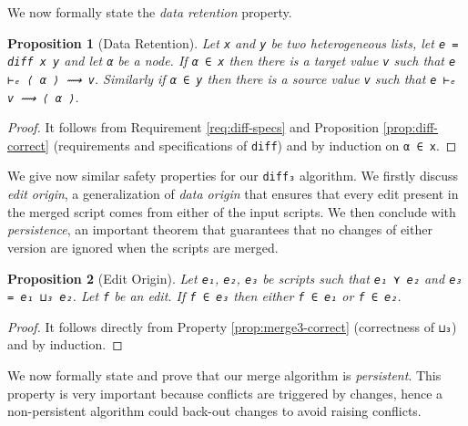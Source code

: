 \documentclass[preprint]{sigplanconf}
\theoremstyle{plain}
\newtheorem{prop}{Proposition}
\begin{document}
We now formally state the \emph{data retention} property.
\begin{prop}[Data Retention]
\label{prop:data-retention}
  Let \texttt{x} and \texttt{y} be two heterogeneous lists, let
  \texttt{e = diff x y} and let \texttt{α} be a node.
%
  If \texttt{α ∈ x} then there is a target value \texttt{v} such that
  \texttt{e ⊢ₑ ⟨ α ⟩ ⟿ v}.
%
  Similarly if \texttt{α ∈ y} then there is a source value \texttt{v} such that
  \texttt{e ⊢ₑ v ⟿ ⟨ α ⟩}.
\end{prop}
\begin{proof}
  It follows from Requirement \ref{req:diff-specs} and Proposition
  \ref{prop:diff-correct} (requirements and specifications of
  \texttt{diff}) and by induction on \texttt{α ∈ x}.
\end{proof}
 
  We give now similar safety properties for our \texttt{diff₃} algorithm.
  We firstly discuss \emph{edit origin}, a generalization of \emph{data origin}
  that ensures that every edit present in the merged script comes from either 
  of the input scripts. We then conclude with  \emph{persistence}, an important 
  theorem that guarantees that no changes of either version are ignored when
  the scripts are merged.

\begin{prop}[Edit Origin]
Let \texttt{e₁}, \texttt{e₂}, \texttt{e₃} be scripts such that
\texttt{e₁ ⋎ e₂} and \texttt{e₃ = e₁ ⊔₃ e₂}. Let \texttt{f} be an edit.
If \texttt{f ∈ e₃} then either \texttt{f ∈ e₁} or \texttt{f ∈ e₂}.
\end{prop}
\begin{proof}
  It follows directly from Property \ref{prop:merge3-correct}
  (correctness of \texttt{⊔₃}) and by induction.
\end{proof}

  We now formally state and prove that our merge algorithm is \emph{persistent}.
  This property is very important because conflicts are triggered by changes,
  hence a non-persistent algorithm could back-out changes to avoid raising
  conflicts.

\end{document}
